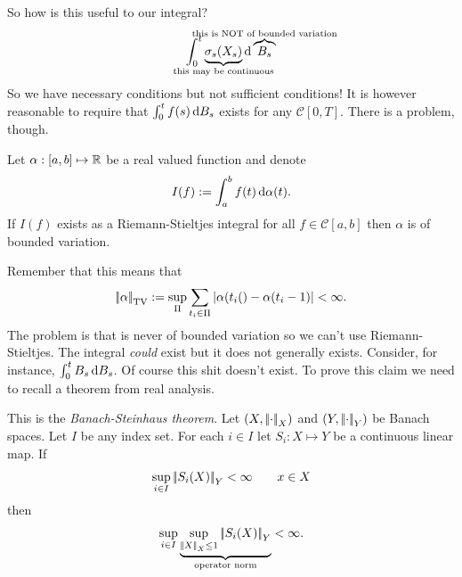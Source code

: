 \documentclass[crop=false, class=article]{standalone}
\begin{document}
So how is this useful to our integral?
\begin{equation*}
	\int_{0}^{t}\underbrace{\sigma_{s}(X_{s})}_{\mathclap{\text{this may be continuous}}}\dif \overbrace{B_{s}}^{\mathclap{\text{this is NOT of bounded variation}}}
\end{equation*}
So we have necessary conditions but not sufficient conditions! It is however reasonable to require that $\int_{0}^{t}f(s)\mathop{}\!\mathrm{d} B_{s}$ exists for any $\mathcal{C}[0,T]$. There is a problem, though.
\begin{proposition}
	Let $\alpha:[a,b]\mapsto\mathbb{R}$ be a real valued function and denote
	\begin{equation*}
		I(f):=\int_{a}^{b}f(t)\mathop{}\!\mathrm{d}\alpha(t).
	\end{equation*}
	If $I(f)$ exists as a Riemann-Stieltjes integral for all $f\in\mathcal{C}[a,b]$ then $\alpha$ is of bounded variation.
\end{proposition}
Remember that this means that 
\begin{equation*}
	\left|\negthinspace\left|\alpha\right|\negthinspace\right|_{\mathrm{TV}}:=\sup_{\Pi}\sum_{t_i\in\Pi}|\alpha(t_{i}()-\alpha(t_{i}-1)|<\infty.
\end{equation*}
The problem is that \brm{} is never of bounded variation so we can't use Riemann-Stieltjes. The integral \textit{could} exist but it does not generally exists. Consider, for instance, $\int_{0}^{t}B_{s}\mathop{}\!\mathrm{d} B_{s}$. Of course this shit doesn't exist.
To prove this claim we need to recall a theorem from real analysis.
\begin{revise}
	This is the \emph{Banach-Steinhaus theorem}. Let $(X,\left|\negthinspace\left|\cdot\right|\negthinspace\right|_{X})$ and $(Y,\left|\negthinspace\left|\cdot\right|\negthinspace\right|_{Y})$ be Banach spaces. Let $I$ be any index set. For each $i\in I$ let $S_{i}:X\mapsto Y$ be a continuous linear map. If
	\begin{equation*}
		\sup_{i\in I}\left|\negthinspace\left|S_{i}(X)\right|\negthinspace\right|_{Y}<\infty\qquad x\in X
	\end{equation*}
	then
	\begin{equation*}
		\sup_{i\in I}\underbrace{\sup_{\left|\negthinspace\left|X\right|\negthinspace\right|_{X}\leq1}\left|\negthinspace\left|S_{i}(X)\right|\negthinspace\right|_{Y}}_{\text{operator norm}}<\infty.
	\end{equation*}
\end{revise}
\end{document}
